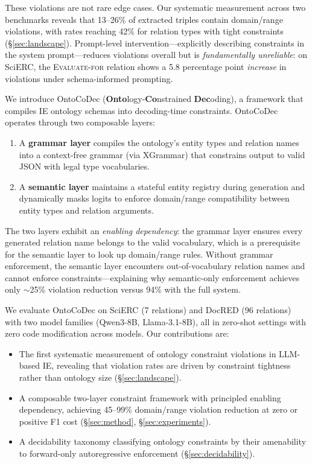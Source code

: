\documentclass[11pt,a4paper]{article}
\newcommand{\sys}{OntoCoDec}
\begin{document}
These violations are not rare edge cases.
Our systematic measurement across two benchmarks reveals that 13--26\% of extracted triples contain domain/range violations, with rates reaching 42\% for relation types with tight constraints (\S\ref{sec:landscape}).
Prompt-level intervention---explicitly describing constraints in the system prompt---reduces violations overall but is \emph{fundamentally unreliable}: on SciERC, the \textsc{Evaluate-for} relation shows a 5.8 percentage point \emph{increase} in violations under schema-informed prompting.

We introduce \sys{} (\textbf{Onto}logy-\textbf{Co}nstrained \textbf{Dec}oding), a framework that compiles IE ontology schemas into decoding-time constraints.
\sys{} operates through two composable layers:
\begin{enumerate}
\item A \textbf{grammar layer} compiles the ontology's entity types and relation names into a context-free grammar (via XGrammar) that constrains output to valid JSON with legal type vocabularies.
\item A \textbf{semantic layer} maintains a stateful entity registry during generation and dynamically masks logits to enforce domain/range compatibility between entity types and relation arguments.
\end{enumerate}

The two layers exhibit an \emph{enabling dependency}: the grammar layer ensures every generated relation name belongs to the valid vocabulary, which is a prerequisite for the semantic layer to look up domain/range rules.
Without grammar enforcement, the semantic layer encounters out-of-vocabulary relation names and cannot enforce constraints---explaining why semantic-only enforcement achieves only $\sim$25\% violation reduction versus 94\% with the full system.

We evaluate \sys{} on SciERC \cite{Luan2018SciERC} (7 relations) and DocRED \cite{Yao2019DocRED} (96 relations) with two model families (Qwen3-8B, Llama-3.1-8B), all in zero-shot settings with zero code modification across models.
Our contributions are:
\begin{itemize}
\item The first systematic measurement of ontology constraint violations in LLM-based IE, revealing that violation rates are driven by constraint tightness rather than ontology size (\S\ref{sec:landscape}).
\item A composable two-layer constraint framework with principled enabling dependency, achieving 45--99\% domain/range violation reduction at zero or positive F1 cost (\S\ref{sec:method}, \S\ref{sec:experiments}).
\item A decidability taxonomy classifying ontology constraints by their amenability to forward-only autoregressive enforcement (\S\ref{sec:decidability}).
\end{itemize}
\end{document}
